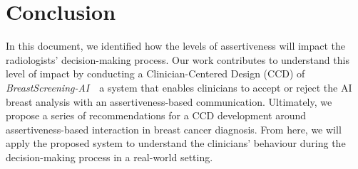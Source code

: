 \section{Conclusion}
\label{sec:sec008}

In this document, we identified how the levels of assertiveness will impact the radiologists' decision-making process.
Our work contributes to understand this level of impact by conducting a Clinician-Centered Design (CCD) of {\it BreastScree\-ning-AI}~\textemdash~a system that enables clinicians to accept or reject the AI breast analysis with an assertiveness-based communication.
Ultimately, we propose a series of recommendations for a CCD development around assertiveness-based interaction in breast cancer diagnosis.
From here, we will apply the proposed system to understand the clinicians' behaviour during the decision-making process in a real-world setting.